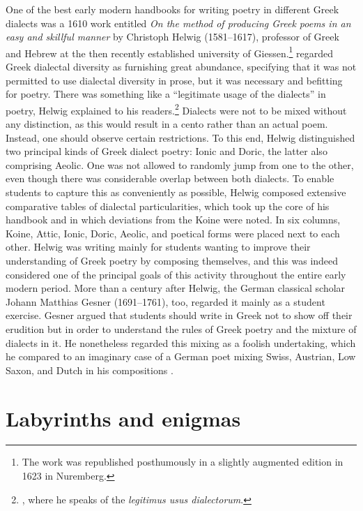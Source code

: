 One of the best early modern handbooks for writing poetry in different Greek dialects was a 1610 work entitled \textit{On the method of producing Greek poems in an easy and skillful manner} by Christoph Helwig (1581–1617), professor of Greek and Hebrew at the then recently established university of Giessen.\footnote{The work was republished posthumously in a slightly augmented edition in 1623 in Nuremberg.} \citet[19]{Helwig1610} regarded Greek dialectal diversity as furnishing great abundance, specifying that it was not permitted to use dialectal diversity in prose, but it was necessary and befitting for poetry. There was something like a “legitimate usage of the dialects” in poetry, Helwig explained to his readers.\footnote{\citet[21–24]{Helwig1610}, where he speaks of the \textit{legitimus usus dialectorum}.} Dialects were not to be mixed without any distinction, as this would result in a cento rather than an actual poem. Instead, one should observe certain restrictions. To this end, Helwig distinguished two principal kinds of Greek dialect poetry: Ionic and Doric, the latter also comprising Aeolic. One was not allowed to randomly jump from one to the other, even though there was considerable overlap between both dialects. To enable students to capture this as conveniently as possible, Helwig composed extensive comparative tables of dialectal particularities, which took up the core of his handbook and in which deviations from the Koine were noted. In six columns, Koine, Attic, Ionic, Doric, Aeolic, and poetical forms were placed next to each other. Helwig was writing mainly for students wanting to improve their understanding of Greek poetry by composing themselves, and this was indeed considered one of the principal goals of this activity throughout the entire early modern period. More than a century after Helwig, the German classical scholar Johann Matthias Gesner (1691–1761), too, regarded it mainly as a student exercise. Gesner argued that students should write in Greek not to show off their erudition but in order to understand the rules of Greek poetry and the mixture of dialects in it. He nonetheless regarded this mixing as a foolish undertaking, which he compared to an imaginary case of a German poet mixing Swiss, Austrian, Low Saxon, and Dutch in his compositions \citep[162]{Gesner1774}.

\section{Labyrinths and enigmas}\label{sec:3.3}

